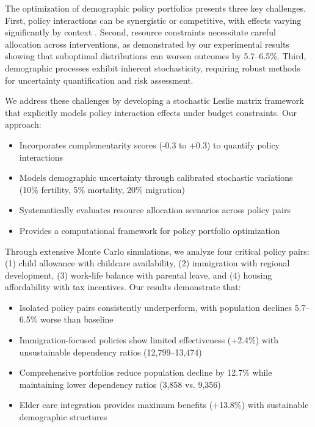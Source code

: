 \documentclass{article} %
\begin{document}
The optimization of demographic policy portfolios presents three key challenges. First, policy interactions can be synergistic or competitive, with effects varying significantly by context \cite{Myrskylä2010ProbabilisticFU}. Second, resource constraints necessitate careful allocation across interventions, as demonstrated by our experimental results showing that suboptimal distributions can worsen outcomes by 5.7--6.5\%. Third, demographic processes exhibit inherent stochasticity, requiring robust methods for uncertainty quantification and risk assessment.

We address these challenges by developing a stochastic Leslie matrix framework that explicitly models policy interaction effects under budget constraints. Our approach:
\begin{itemize}
    \item Incorporates complementarity scores (-0.3 to +0.3) to quantify policy interactions
    \item Models demographic uncertainty through calibrated stochastic variations (10\% fertility, 5\% mortality, 20\% migration)
    \item Systematically evaluates resource allocation scenarios across policy pairs
    \item Provides a computational framework for policy portfolio optimization
\end{itemize}

Through extensive Monte Carlo simulations, we analyze four critical policy pairs: (1) child allowance with childcare availability, (2) immigration with regional development, (3) work-life balance with parental leave, and (4) housing affordability with tax incentives. Our results demonstrate that:
\begin{itemize}
    \item Isolated policy pairs consistently underperform, with population declines 5.7--6.5\% worse than baseline
    \item Immigration-focused policies show limited effectiveness (+2.4\%) with unsustainable dependency ratios (12,799--13,474)
    \item Comprehensive portfolios reduce population decline by 12.7\% while maintaining lower dependency ratios (3,858 vs. 9,356)
    \item Elder care integration provides maximum benefits (+13.8\%) with sustainable demographic structures
\end{itemize}
\end{document}
